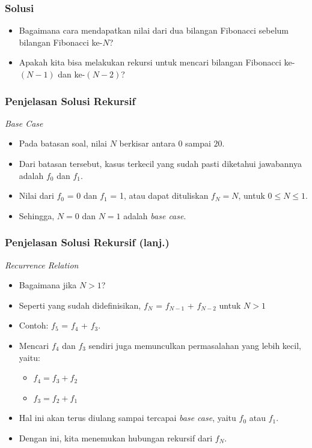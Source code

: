 \begin{frame}
\frametitle{Solusi}
\begin{itemize}
  \item Bagaimana cara mendapatkan nilai dari dua bilangan Fibonacci sebelum bilangan Fibonacci ke-$N$?
  \item Apakah kita bisa melakukan rekursi untuk mencari bilangan Fibonacci ke-$(N-1)$ dan ke-$(N-2)$?
\end{itemize}
\end{frame}

\begin{frame}
\frametitle{Penjelasan Solusi Rekursif}
\textit{Base Case}
\begin{itemize}
  \item Pada batasan soal, nilai $N$ berkisar antara $0$ sampai $20$.
  \item Dari batasan tersebut, kasus terkecil yang sudah pasti diketahui jawabannya adalah $f_0$ dan $f_1$.
  \item Nilai dari $f_0$ = 0 dan $f_1$ = 1, atau dapat dituliskan $f_N = N$, untuk $0 \le N \le 1$.
  \item Sehingga, $N=0$ dan $N=1$ adalah \textit{base case}.
\end{itemize}
\end{frame}

\begin{frame}
\frametitle{Penjelasan Solusi Rekursif (lanj.) }
\textit{Recurrence Relation}
\begin{itemize}
  \item Bagaimana jika $N > 1$?
  \item Seperti yang sudah didefinisikan, $f_N$ = $f_{N-1}$ + $f_{N-2}$ untuk $N > 1$
  \item Contoh: $f_5$ = $f_4$ + $f_3$.
  \item Mencari $f_4$ dan $f_3$ sendiri juga memunculkan permasalahan yang lebih kecil, yaitu:
  \begin{itemize}
    \item $f_4 = f_3 + f_2$
    \item $f_3 = f_2 + f_1$ 
  \end{itemize}
  \item Hal ini akan terus diulang sampai tercapai \textit{base case}, yaitu $f_0$ atau $f_1$.
  \item Dengan ini, kita menemukan hubungan rekursif dari $f_N$.
\end{itemize}
\end{frame}

